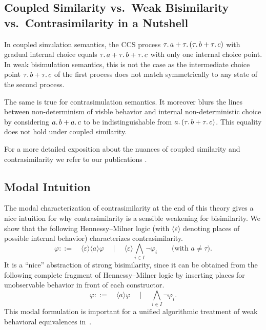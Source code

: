 \documentclass[10pt,a4paper]{article}
\begin{document}
\subsection{Coupled Similarity vs.\ Weak Bisimilarity vs.\ Contrasimilarity in a Nutshell}

In coupled simulation semantics, the CCS process $\tau \ldotp a + \tau \ldotp (\tau \ldotp b + \tau \ldotp c)$
with gradual internal choice equals $\tau \ldotp a + \tau \ldotp b + \tau \ldotp c$ with only one internal choice point.
In weak bisimulation semantics, this is not the case as the intermediate choice point
$\tau \ldotp b + \tau \ldotp c$ of the first process does not match symmetrically to any state of the second process.

The same is true for contrasimulation semantics. It moreover blurs the lines between non-determinism
of visble behavior and internal non-deterministic choice by considering  $a \ldotp b + a \ldotp c$ to be
indistinguishable from $a \ldotp (\tau \ldotp b + \tau \ldotp c)$. This equality does not hold under coupled similarity.

For a more detailed exposition about the nuances of coupled similarity and contrasimilarity we refer
to our publications \cite{bn2019coupledsimTacas,bnp2020coupledsim32,bm2021contrasimilarity}.

\subsection{Modal Intuition}

The modal characterization of contrasimilarity at the end of this theory gives a nice intuition
for why contrasimilarity is a sensible weakening for bisimilarity. We show that the following
Hennessy--Milner logic (with $\langle \varepsilon \rangle$ denoting places of possible internal
behavior) characterizes contrasimilarity.
\[
  \varphi  ::= \quad \langle \varepsilon \rangle \langle a\rangle \varphi
    \quad \mid \quad \langle \varepsilon \rangle \bigwedge_{i \in I} \neg \varphi_i
       \qquad \text{(with $a \neq \tau$).}
\]
It is a ``nice'' abstraction of strong bisimilarity, since it can be obtained from the following
complete fragment of Hennessy--Milner logic by inserting places for unobservable behavior in front of
each constructor.
\[
    \varphi  ::= \quad \langle a \rangle \varphi
      \quad \mid \quad \bigwedge_{i \in I} \neg \varphi_i .
\]
This modal formulation is important for a unified algorithmic treatment of weak behavioral equivalences
in~\cite{bj2023ltbtsSilentSteps}.



{}


\end{document}
